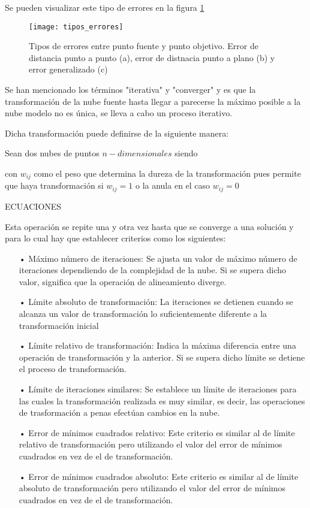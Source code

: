 Se pueden visualizar este tipo de errores en la figura \ref{fig:tipos_errores} 

\begin{figure}
\centering
\texttt{[image: tipos\_errores]}
\caption{Tipos de errores entre punto fuente y punto objetivo. Error de distancia punto a punto (a), error de distnacia punto a plano (b) y error generalizado (c)}\label{fig:tipos_errores}
\end{figure}

Se han mencionado los términos "iterativa" y "converger" y es que la transformación de la nube fuente hasta llegar a parecerse la máximo posible a la nube modelo no es única, se lleva a cabo un proceso iterativo. 


Dicha transformación puede definirse de la siguiente manera:


Sean dos nubes de puntos $n-dimensionales$ siendo

con $w_{ij}$ como el peso que determina la dureza de la transformación pues permite que haya transformación si $w_{ij}=1$ o la anula en el caso $w_{ij}=0$

ECUACIONES


Esta operación se repite una y otra vez hasta que se converge a una solución y para lo cual hay que establecer criterios como los siguientes:

\begin{itemize}
\item[•]Máximo número de iteraciones:
Se ajusta un valor de máximo número de iteraciones dependiendo de la complejidad de la nube. Si se supera dicho valor, significa que la operación de alineamiento diverge.
\item[•]Límite absoluto de transformación: 
La iteraciones se detienen cuando se alcanza un valor de transformación lo suficientemente diferente a la transformación inicial
\item[•]Límite relativo de transformación:
Indica la máxima diferencia entre una operación de transformación y la anterior. Si se supera dicho límite se detiene el proceso de transformación.
\item[•]Límite de iteraciones similares: 
Se establece un límite de iteraciones para las cuales la transformación realizada es muy similar, es decir, las operaciones de trasformación a penas efectúan cambios en la nube.
\item[•]Error de mínimos cuadrados relativo:
Este criterio es similar al de límite relativo de transformación pero utilizando el valor del error de mínimos cuadrados en vez de el de transformación.
\item[•]Error de mínimos cuadrados absoluto:
Este criterio es similar al de límite absoluto de transformación pero utilizando el valor del error de mínimos cuadrados en vez de el de transformación.
\end{itemize}

